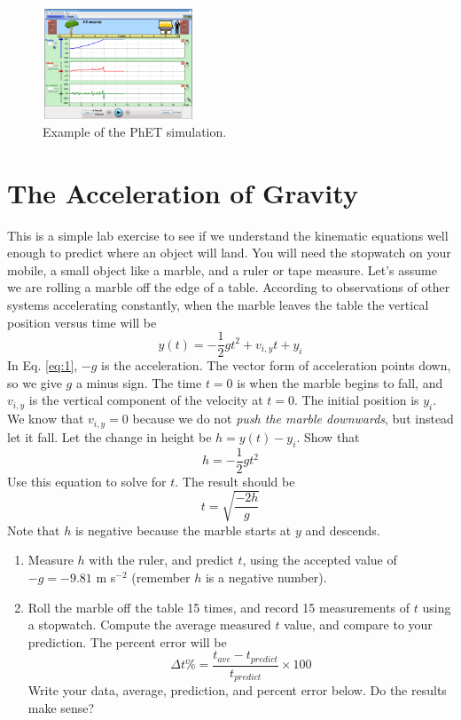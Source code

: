 \documentclass{article}
\begin{document}
\begin{figure}[hb]
\centering
\includegraphics[width=0.4\textwidth]{figures/man.png}
\caption{Example of the PhET simulation.}
\end{figure}

\section{The Acceleration of Gravity}

This is a simple lab exercise to see if we understand the kinematic equations well enough to predict where an object will land.  You will need the stopwatch on your mobile, a small object like a marble, and a ruler or tape measure.  Let's assume we are rolling a marble off the edge of a table.  According to observations of other systems accelerating constantly, when the marble leaves the table the vertical position versus time will be 
\begin{equation}
y(t) = -\frac{1}{2}gt^2 + v_{i,y} t + y_i \label{eq:1}
\end{equation}
In Eq. \ref{eq:1}, $-g$ is the acceleration.  The vector form of acceleration points down, so we give $g$ a minus sign.  The time $t=0$ is when the marble begins to fall, and $v_{i,y}$ is the vertical component of the velocity at $t=0$.  The initial position is $y_i$.  We know that $v_{i,y} = 0$ because we do not \textit{push the marble downwards}, but instead let it fall.  Let the change in height be $h = y(t) - y_i$.  Show that
\begin{equation}
h = -\frac{1}{2}g t^2
\end{equation}
Use this equation to solve for $t$.  The result should be
\begin{equation}
t = \sqrt{\frac{-2h}{g}}
\end{equation}
Note that $h$ is negative because the marble starts at $y$ and descends.
\begin{enumerate}
\item Measure $h$ with the ruler, and predict $t$, using the accepted value of $-g = -9.81$ m s$^{-2}$ (remember $h$ is a negative number).
\item Roll the marble off the table 15 times, and record 15 measurements of $t$ using a stopwatch.  Compute the average measured $t$ value, and compare to your prediction.  The percent error will be
\begin{equation}
\Delta t\% = \frac{t_{ave} - t_{predict}}{t_{predict}} \times 100
\end{equation}
Write your data, average, prediction, and percent error below.  Do the results make sense?
\end{enumerate}
\end{document}

